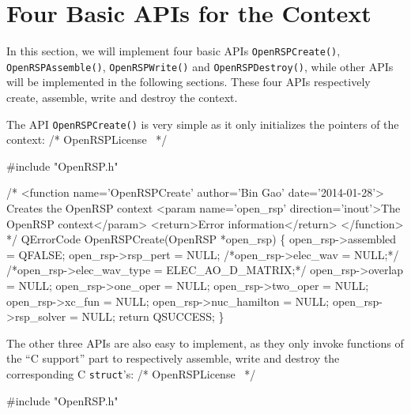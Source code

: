 \section{Four Basic APIs for the \LibName Context}

In this section, we will implement four basic APIs {\tt{}OpenRSPCreate()},
{\tt{}OpenRSPAssemble()}, {\tt{}OpenRSPWrite()} and {\tt{}OpenRSPDestroy()}, while other
APIs will be implemented in the following sections. These four APIs
respectively create, assemble, write and destroy the \LibName context.

The API {\tt{}OpenRSPCreate()} is very simple as it only initializes the pointers
of the context:
\nwenddocs{}\endmoddef
/*
  \LA{}OpenRSPLicense~{\nwtagstyle{}}\RA{}
*/

#include "OpenRSP.h"

/* <function name='OpenRSPCreate' author='Bin Gao' date='2014-01-28'>
     Creates the OpenRSP context
     <param name='open_rsp' direction='inout'>The OpenRSP context</param>
     <return>Error information</return>
   </function> */
QErrorCode OpenRSPCreate(OpenRSP *open_rsp)
\{
    open_rsp->assembled = QFALSE;
    open_rsp->rsp_pert = NULL;
    /*open_rsp->elec_wav = NULL;*/
    /*open_rsp->elec_wav_type = ELEC_AO_D_MATRIX;*/
    open_rsp->overlap = NULL;
    open_rsp->one_oper = NULL;
    open_rsp->two_oper = NULL;
    open_rsp->xc_fun = NULL;
    open_rsp->nuc_hamilton = NULL;
    open_rsp->rsp_solver = NULL;
    return QSUCCESS;
\}

\nwendcode{}The other three APIs are also easy to implement, as they only invoke
functions of the ``\LibName C support'' part to respectively assemble, write
and destroy the corresponding C {\tt{}struct}'s:
\nwenddocs{}\endmoddef
/*
  \LA{}OpenRSPLicense~{\nwtagstyle{}}\RA{}
*/

#include "OpenRSP.h"

